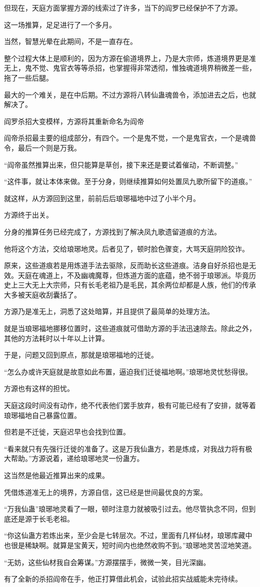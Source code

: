 \begin{this_body}
但现在，天庭方面掌握方源的线索过了许多，当下的阎罗已经保护不了方源。

这一场推算，足足进行了一个多月。

当然，智慧光晕在此期间，不是一直存在。

整个过程大体上是顺利的，因为方源在偷道境界上，乃是大宗师，炼道境界更是准无上，鬼不觉、鬼官衣等等杀招，也掌握得非常透彻，惟独魂道境界稍微差一些，拖了一些后腿。

最大的一个难关，是在中后期。不过方源将八转仙蛊魂兽令，添加进去之后，也就解决了。

阎罗杀招大变模样，方源将其重新命名为阎帝

阎帝杀招最主要的组成部分，有四个。一个是鬼不觉，一个是鬼官衣，一个是魂兽令，最后一个则是万我。

“阎帝虽然推算出来，但只能算是草创，接下来还是要试着催动，不断调整。”

“这件事，就让本体来做。至于分身，则继续推算如何处置凤九歌所留下的道痕。”

就这样，从方源回到这里，前前后后琅琊福地中过了小半个月。

方源终于出关。

分身的推算任务已经完成了，方源找到了解决凤九歌遗留道痕的方法。

他将这个方法，交给琅琊地灵。后者见了，顿时脸色骤变，大骂天庭阴险狡诈。

原来，这些道痕若是用炼道手法去驱除，反而助长这些道痕。洁身自好杀招也是无效。天庭在魂道上，不及幽魂魔尊，但炼道方面的底蕴，绝不弱于琅琊派。毕竟历史上三大无上大宗师，只有长毛老祖乃是毛民，其余两位却都是人族，他们的传承大多被天庭收刮囊括了。

方源乃是准无上，洞悉了这处暗算，并且提供了最简单的处理方法。

就是当琅琊福地挪移位置时，这些道痕就可借助方源的手法迅速除去。除此之外，其他的方法耗时以十年以上计算。

于是，问题又回到原点，那就是琅琊福地的迁徙。

“怎么办或许天庭就是故意如此布置，逼迫我们迁徙福地啊。”琅琊地灵忧愁得很。

方源也有这样的担忧。

天庭这段时间没有动作，绝不代表他们罢手放弃，极有可能已经有了安排，就等着琅琊福地自己暴露位置。

但若是不迁徙，天庭迟早也会找到位置。

“看来就只有先强行迁徙的准备了。这是万我仙蛊方，若是炼成，对我战力将有极大帮助。”方源说着，递给琅琊地灵一份蛊方。

这当然是他最近推算出来的成果。

凭借炼道准无上的境界，方源自信，这已经是世间最优良的方案。

“万我仙蛊”琅琊地灵看了一眼，顿时注意力就被吸引过去。他尽管执念不同，但到底还是源于长毛老祖。

“你这仙蛊方若炼出来，至少会是七转层次。不过，里面有几样仙材，琅琊库藏中也很是稀缺啊。就算是宝黄天，短时间内也绝然收购不到。”琅琊地灵苦涩地笑道。

“无妨，这些仙材我自会筹谋。”方源摆摆手，微微一笑，目光深幽。

有了全新的杀招阎帝在手，他正打算借此机会，试验此招实战威能未完待续。

\end{this_body}

